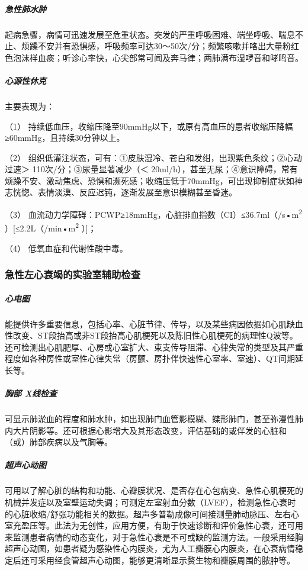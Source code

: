 \subparagraph{急性肺水肿}

起病急骤，病情可迅速发展至危重状态。突发的严重呼吸困难、端坐呼吸、喘息不止、烦躁不安并有恐惧感，呼吸频率可达30～50次/分；频繁咳嗽并咯出大量粉红色泡沫样血痰；听诊心率快，心尖部常可闻及奔马律；两肺满布湿啰音和哮鸣音。

\subparagraph{心源性休克}

主要表现为：

（1）
持续低血压，收缩压降至90mmHg以下，或原有高血压的患者收缩压降幅≥60mmHg，且持续30分钟以上。

（2）
组织低灌注状态，可有：①皮肤湿冷、苍白和发绀，出现紫色条纹；②心动过速＞
110次/分；③尿量显著减少（＜
20ml/h），甚至无尿；④意识障碍，常有烦躁不安、激动焦虑、恐惧和濒死感；收缩压低于70mmHg，可出现抑制症状如神志恍惚、表情淡漠、反应迟钝，逐渐发展至意识模糊甚至昏迷。

（3）
血流动力学障碍：PCWP≥18mmHg，心脏排血指数（CI）≤36.7ml（/s•m\textsuperscript{2}
）{[}≤2.2L（/min•m\textsuperscript{2} ）{]}；

（4） 低氧血症和代谢性酸中毒。

\subsubsection{急性左心衰竭的实验室辅助检查}

\subparagraph{心电图}

能提供许多重要信息，包括心率、心脏节律、传导，以及某些病因依据如心肌缺血性改变、ST段抬高或非ST段抬高心肌梗死以及陈旧性心肌梗死的病理性Q波等。还可检测出心肌肥厚、心房或心室扩大、束支传导阻滞、心律失常的类型及其严重程度如各种房性或室性心律失常（房颤、房扑伴快速性心室率、室速）、QT间期延长等。

\subparagraph{胸部 X线检查}

可显示肺淤血的程度和肺水肿，如出现肺门血管影模糊、蝶形肺门，甚至弥漫性肺内大片阴影等。还可根据心影增大及其形态改变，评估基础的或伴发的心脏和（或）肺部疾病以及气胸等。

\subparagraph{超声心动图}

可用以了解心脏的结构和功能、心瓣膜状况、是否存在心包病变、急性心肌梗死的机械并发症以及室壁运动失调；可测定左室射血分数（LVEF），检测急性心衰时的心脏收缩/舒张功能相关的数据。超声多普勒成像可间接测量肺动脉压、左右心室充盈压等。此法为无创性，应用方便，有助于快速诊断和评价急性心衰，还可用来监测患者病情的动态变化，对于急性心衰是不可或缺的监测方法。一般采用经胸超声心动图，如患者疑为感染性心内膜炎，尤为人工瓣膜心内膜炎，在心衰病情稳定后还可采用经食管超声心动图，能够更清晰显示赘生物和瓣膜周围的脓肿等。

